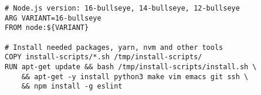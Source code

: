 
\begin{lstlisting}[language=docker, frame=single, caption={NodeJS DevContainer Dockerfile},label=code::docker_dev_node]
# Node.js version: 16-bullseye, 14-bullseye, 12-bullseye
ARG VARIANT=16-bullseye
FROM node:${VARIANT}

# Install needed packages, yarn, nvm and other tools
COPY install-scripts/*.sh /tmp/install-scripts/
RUN apt-get update && bash /tmp/install-scripts/install.sh \
    && apt-get -y install python3 make vim emacs git ssh \
    && npm install -g eslint
\end{lstlisting}

